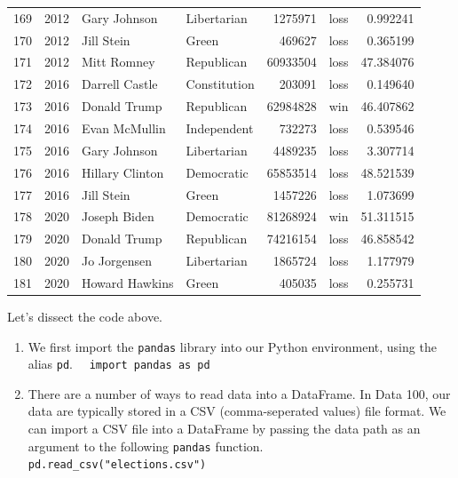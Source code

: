 \documentclass[
  letterpaper,
  DIV=11,
  numbers=noendperiod]{scrreprt}
\begin{document}
\begin{tabular}{lrllrlr}
169 &  2012 &            Gary Johnson &            Libertarian &       1275971 &   loss &   0.992241 \\
170 &  2012 &              Jill Stein &                  Green &        469627 &   loss &   0.365199 \\
171 &  2012 &             Mitt Romney &             Republican &      60933504 &   loss &  47.384076 \\
172 &  2016 &          Darrell Castle &           Constitution &        203091 &   loss &   0.149640 \\
173 &  2016 &            Donald Trump &             Republican &      62984828 &    win &  46.407862 \\
174 &  2016 &           Evan McMullin &            Independent &        732273 &   loss &   0.539546 \\
175 &  2016 &            Gary Johnson &            Libertarian &       4489235 &   loss &   3.307714 \\
176 &  2016 &         Hillary Clinton &             Democratic &      65853514 &   loss &  48.521539 \\
177 &  2016 &              Jill Stein &                  Green &       1457226 &   loss &   1.073699 \\
178 &  2020 &            Joseph Biden &             Democratic &      81268924 &    win &  51.311515 \\
179 &  2020 &            Donald Trump &             Republican &      74216154 &   loss &  46.858542 \\
180 &  2020 &            Jo Jorgensen &            Libertarian &       1865724 &   loss &   1.177979 \\
181 &  2020 &          Howard Hawkins &                  Green &        405035 &   loss &   0.255731 \\
\bottomrule
\end{tabular}

Let's dissect the code above.

\begin{enumerate}
\def\labelenumi{\arabic{enumi}.}
\item
  We first import the \texttt{pandas} library into our Python
  environment, using the alias \texttt{pd}.
   \texttt{import\ pandas\ as\ pd}
\item
  There are a number of ways to read data into a DataFrame. In Data 100,
  our data are typically stored in a CSV (comma-seperated values) file
  format. We can import a CSV file into a DataFrame by passing the data
  path as an argument to the following \texttt{pandas} function.
   \texttt{pd.read\_csv("elections.csv")}
\end{enumerate}
\end{document}
